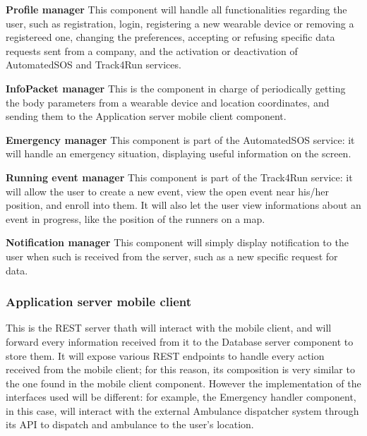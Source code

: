 \documentclass[../main.tex]{subfiles}
\begin{document}
\begin{description}

	\item{\bf Profile manager} This component will handle all functionalities regarding the user, such as registration, login, registering a new wearable device or removing a registereed one, changing the preferences, accepting or refusing specific data requests sent from a company, and the activation or deactivation of AutomatedSOS and Track4Run services.

	\item{\bf InfoPacket manager} This is the component in charge of periodically getting the body parameters from a wearable device and location coordinates, and sending them to the Application server mobile client component.

	\item{\bf Emergency manager} This component is part of the AutomatedSOS service: it will handle an emergency situation, displaying useful information on the screen.

	\item{\bf Running event manager} This component is part of the Track4Run service: it will allow the user to create a new event, view the open event near his/her position, and enroll into them. It will also let the user view informations about an event in progress, like the position of the runners on a map.

	\item{\bf Notification manager} This component will simply display notification to the user when such is received from the server, such as a new specific request for data.

\end{description}

\subsubsection{Application server mobile client} This is the REST server thath will interact with the mobile client, and will forward every information received from it to the Database server component to store them. It will expose various REST endpoints to handle every action received from the mobile client; for this reason, its composition is very similar to the one found in the mobile client component. However the implementation of the interfaces used will be different: for example, the Emergency handler component, in this case, will interact with the external Ambulance dispatcher system through its API to dispatch and ambulance to the user's location.
\end{document}
